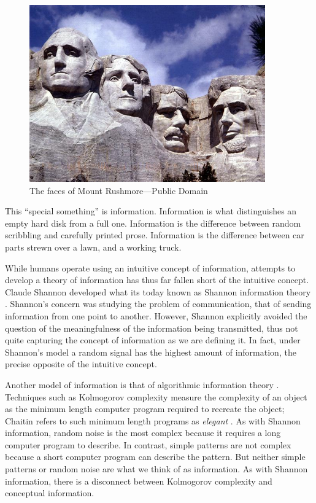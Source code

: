 \begin{figure}
\centering
\includegraphics[width=4in]{MountRushmore.jpg}
\caption{The faces of Mount Rushmore---Public Domain}
\end{figure}

This ``special something'' is information.
Information is what distinguishes an empty hard disk from a full one.
Information is the difference between random scribbling and carefully printed prose.
Information is the difference between car parts strewn over a lawn, and a working truck.

While humans operate using an intuitive concept of information, attempts to develop a theory of information has thus far fallen short of the intuitive concept.
Claude Shannon developed what its today known as Shannon information theory \citep{Shannon1948}.
Shannon's concern was studying the problem of communication, that of sending information from one point to another.
However, Shannon explicitly avoided the question of the meaningfulness of the information being transmitted, thus not quite capturing the concept of information as we are defining it.
In fact, under Shannon's model a random signal has the highest amount of information, the precise opposite of the intuitive concept.

Another model of information is that of algorithmic information theory \citep{Chaitin1966, Solomonoff1960, Kolmogorov1968a}.
Techniques such as Kolmogorov complexity measure the complexity of an object as the minimum length computer program required to recreate the object; Chaitin refers to such minimum length programs as \textit{elegant} \citep{Chaitin2002}.
As with Shannon information, random noise is the most complex because it requires a long computer program to describe.
In contrast, simple patterns are not complex because a short computer program can describe the pattern.
But neither simple patterns or random noise are what we think of as information.
As with Shannon information, there is a disconnect between Kolmogorov complexity and conceptual information.

